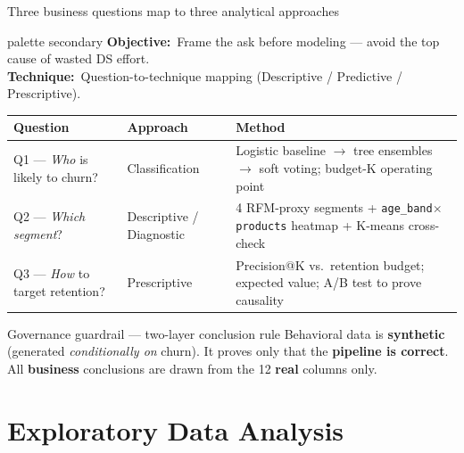 \documentclass[11pt,aspectratio=169]{beamer}
\newcommand{\aimtech}[2]{%
  \begin{beamercolorbox}[wd=\textwidth,sep=5pt,rounded=true]{palette secondary}
    \footnotesize\textbf{Objective:}~#1\\[1pt]\textbf{Technique:}~#2
  \end{beamercolorbox}\vspace{3pt}%
}
\begin{document}
\begin{frame}{Three business questions map to three analytical approaches}
  \aimtech{Frame the ask before modeling --- avoid the top cause of wasted DS effort.}%
          {Question-to-technique mapping (Descriptive / Predictive / Prescriptive).}
  \renewcommand{\arraystretch}{1.3}
  \begin{center}
  \footnotesize
  \begin{tabularx}{\textwidth}{@{}p{}p{}X@{}}
    \toprule
    \textbf{Question} & \textbf{Approach} & \textbf{Method} \\
    \midrule
    Q1 --- \emph{Who} is likely to churn? & Classification & Logistic baseline \(\to\) tree ensembles \(\to\) soft voting; budget-K operating point \\
    Q2 --- \emph{Which segment}? & Descriptive / Diagnostic & 4 RFM-proxy segments + \texttt{age\_band}\(\times\)\texttt{products} heatmap + K-means cross-check \\
    Q3 --- \emph{How} to target retention? & Prescriptive & Precision@K vs.\ retention budget; expected value; A/B test to prove causality \\
    \bottomrule
  \end{tabularx}
  \end{center}
  \begin{alertblock}{\small Governance guardrail --- two-layer conclusion rule}
    \footnotesize Behavioral data is \textbf{synthetic} (generated \emph{conditionally on} churn). It proves only that the \textbf{pipeline is correct}. All \textbf{business} conclusions are drawn from the 12 \textbf{real} columns only.
  \end{alertblock}
\end{frame}

\section{Exploratory Data Analysis}
\end{document}
